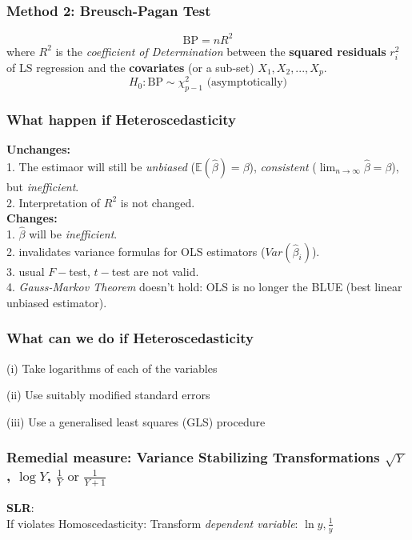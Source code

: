 \documentclass[11pt,a4paper]{article}
\begin{document}
\subsubsection{Method 2: Breusch-Pagan Test}
$$\text{BP}=nR^2$$
where $R^2$ is the \textit{coeﬃcient of Determination} between the \textbf{squared residuals} $r_i^2$ of LS regression and the \textbf{covariates} (or a sub-set) $X_1 , X_2 , . . . , X_p $.
$$
    H_0:\text{BP}\sim \chi^2_{p-1} \text{ (asymptotically)}
$$

\subsubsection{What happen if Heteroscedasticity}
\textbf{Unchanges:}\\
1. The estimaor will still be \textit{unbiased} ($\mathbb{E}(\hat{\beta})=\beta$), \textit{consistent} ($\lim_{n \rightarrow	\infty}\hat{\beta}=\beta$), but \textit{inefficient}.\\
2. Interpretation of $R^2$ is not changed.\\
\textbf{Changes:}\\
1. $\hat{\beta}$ will be \textit{inefficient}.\\
2. invalidates variance formulas for OLS estimators (${Var}(\hat{\beta}_i)$).\\
3. usual $F-$test, $t-$test are not valid.\\
4. \textit{Gauss-Markov Theorem} doesn't hold: OLS is no longer the BLUE (best linear unbiased estimator).


\subsubsection{What can we do if Heteroscedasticity}
(i) Take logarithms of each of the variables

(ii) Use suitably modified standard errors

(iii) Use a generalised least squares (GLS) procedure



\subsubsection{Remedial measure: Variance Stabilizing Transformations $\sqrt{Y}$, $\log{Y}$, $\frac{1}{Y}\text{ or }\frac{1}{Y+1}$}
\textbf{SLR}:\\
If violates Homoscedasticity: Transform \textit{dependent variable}: $\ln{y}, \frac{1}{y}$\\
\end{document}
